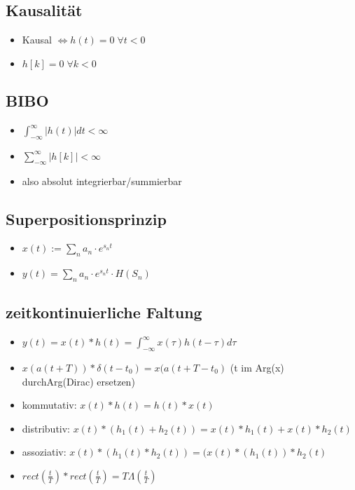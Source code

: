 \documentclass{article}
\begin{document}
\subsection{Kausalität}
\begin{itemize}
\item Kausal $\Leftrightarrow h(t) = 0 \;  \forall t < 0$
\item $h[k] = 0 \; \forall k<0$
\end{itemize}

\subsection{BIBO}
\begin{itemize}
\item $\int_{-\infty}^\infty |h(t)|dt < \infty$
\item $\sum_{-\infty}^\infty |h[k]| < \infty$
\item also absolut integrierbar/summierbar
\end{itemize}

\subsection{Superpositionsprinzip}
\begin{itemize}
\item $x(t) := \sum_n a_n\cdot e^{s_nt}$
\item $y(t) = \sum_n  a_n \cdot e^{s_n t} \cdot H(S_n)$
\end{itemize}


\subsection{zeitkontinuierliche Faltung}
\begin{itemize}
\item $y(t) = x(t)*h(t) = \int_{-\infty}^\infty x(\tau)h(t-\tau) d\tau$
\item $x(a(t+T))*\delta(t-t_0) = x(a(t+T-t_0)$ (t im Arg(x) durchArg(Dirac) ersetzen)
\item kommutativ: $x(t)*h(t) = h(t)*x(t)$
\item distributiv: $x(t)*(h_1(t)+h_2(t)) =x(t)*h_1(t)+x(t)*h_2(t)$
\item assoziativ: $x(t)*(h_1(t)*h_2(t)) = (x(t)*(h_1(t))*h_2(t)$
\item $rect(\frac{t}{T})*rect(\frac{t}{T}) =T \Lambda(\frac{t}{T})$
\end{itemize}
\end{document}
